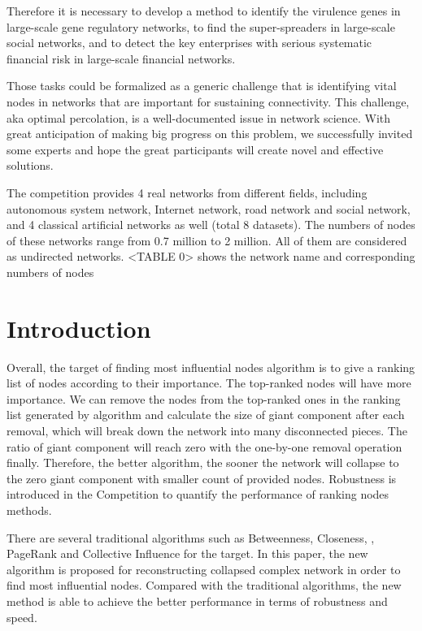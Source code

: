\documentclass{article}
\begin{document}
	Therefore it is necessary to develop a method to identify the virulence genes in large-scale gene regulatory networks, to find the super-spreaders in large-scale social networks, and to detect the key enterprises with serious systematic financial risk in large-scale financial networks.
	
	Those tasks could be formalized as a generic challenge that is identifying vital nodes in networks that are important for sustaining connectivity. This challenge, aka optimal percolation, is a well-documented issue in network science. With great anticipation of making big progress on this problem, we successfully invited some experts and hope the great participants will create novel and effective solutions.  \cite{masterCompetitionbackground}
	
	The competition provides 4 real networks from different fields, including autonomous system network, Internet network, road network and social network, and 4 classical artificial networks as well (total 8 datasets). The numbers of nodes of these networks range from 0.7 million to 2 million. All of them are considered as undirected networks. <TABLE 0> shows the network name and corresponding numbers of nodes 	
	

	\section{Introduction}


	Overall, the target of finding most influential nodes algorithm is to give a ranking list of nodes according to their importance. The top-ranked nodes will have more importance. We can remove the nodes from the top-ranked ones in the ranking list generated by algorithm and calculate the size of giant component after each removal, which will break down the network into many disconnected pieces. The ratio of giant component will reach zero with the one-by-one removal operation finally. Therefore, the better algorithm, the sooner the network will collapse to the zero giant component with smaller count of provided nodes. Robustness \cite{schneider2011mitigation} is introduced in the Competition to quantify the performance of ranking nodes methods. 
	
	There are several traditional algorithms such as  Betweenness\cite{wikiBetweennesscentrality}, Closeness\cite{wikiClosenesscentrality}, \cite{wikiCentrality}, PageRank\cite{wikiPageRank} and Collective Influence\cite{morone2015influence}\cite{morone2016collective} for the target. In this paper, the new algorithm is proposed for reconstructing collapsed complex network in order to find most influential nodes. Compared with the traditional algorithms, the new method is able to achieve the better performance in terms of robustness and speed. 
	
\end{document}
